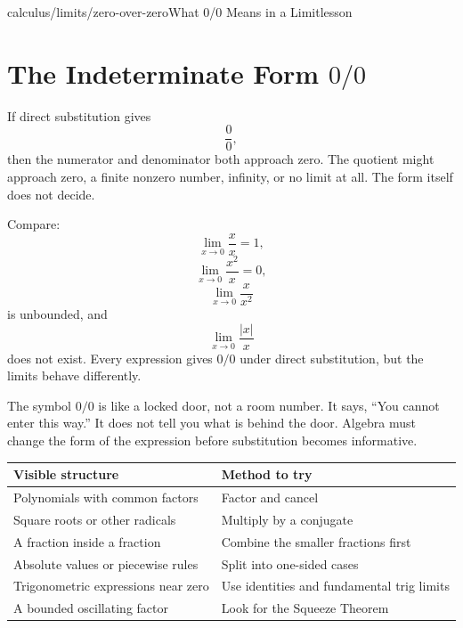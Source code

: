 \begin{webpage}{calculus/limits/zero-over-zero}{What 0/0 Means in a Limit}{lesson}
\section{The Indeterminate Form \texorpdfstring{\(0/0\)}{0/0}}




If direct substitution gives
\[
  \frac00,
\]
then the numerator and denominator both approach zero. The quotient might approach zero, a finite nonzero number, infinity, or no limit at all. The form itself does not decide.

Compare:
\[
  \lim_{x\to0}\frac{x}{x}=1,
\]
\[
  \lim_{x\to0}\frac{x^2}{x}=0,
\]
\[
  \lim_{x\to0}\frac{x}{x^2}
\]
is unbounded, and
\[
  \lim_{x\to0}\frac{|x|}{x}
\]
does not exist. Every expression gives \(0/0\) under direct substitution, but the limits behave differently.

\begin{bgconcept}
The symbol \(0/0\) is like a locked door, not a room number. It says, ``You cannot enter this way.'' It does not tell you what is behind the door. Algebra must change the form of the expression before substitution becomes informative.
\end{bgconcept}

\begin{bghomework}[title={Method Selection After \(0/0\)}]
\begin{center}
\begin{tabularx}{\textwidth}{@{}p{}X@{}}
\toprule
\textbf{Visible structure} & \textbf{Method to try}\\
\midrule
Polynomials with common factors & Factor and cancel\\
Square roots or other radicals & Multiply by a conjugate\\
A fraction inside a fraction & Combine the smaller fractions first\\
Absolute values or piecewise rules & Split into one-sided cases\\
Trigonometric expressions near zero & Use identities and fundamental trig limits\\
A bounded oscillating factor & Look for the Squeeze Theorem\\
\bottomrule
\end{tabularx}
\end{center}
\end{bghomework}
\end{webpage}

